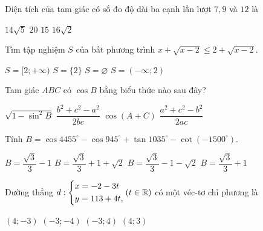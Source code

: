 \begin{ex}%
Diện tích của tam giác có số đo độ dài ba cạnh lần lượt  $7,9$ và $12$ là 

	\choice
{\True $14\sqrt{5}$}
{$20$}
{$15$}
{$16\sqrt{2}$}
\end{ex}

\begin{ex}%
Tìm tập nghiệm $S$ của bất phương trình $x+\sqrt{x-2} \le 2+\sqrt{x-2}$.

	\choice
{$S=[2;+\infty)$}
{\True $S=\{2\}$}
{$S=\varnothing$}
{$S=(-\infty;2)$}
\end{ex}

\begin{ex}%
Tam giác $ABC$ có $\cos B$ bằng biểu thức nào sau đây?

	\choice
{$\sqrt{1-\sin^2B}$}
{$\dfrac{b^2+c^2-a^2}{2bc}$}
{$\cos(A+C)$}
{\True $\dfrac{a^2+c^2-b^2}{2ac}$}
\end{ex}

\begin{ex}%
Tính $B = \cos 4455^\circ - \cos 945^\circ + \tan 1035^\circ - \cot(-1500^\circ).$

	\choice
{\True $B = \dfrac{\sqrt{3}}{3} -1$}
{$B =  \dfrac{\sqrt{3}}{3} +1+\sqrt{2}$}
{$B =  \dfrac{\sqrt{3}}{3} -1-\sqrt{2}$}
{$B =  \dfrac{\sqrt{3}}{3} +1$}
\end{ex}

\begin{ex}%
Đường thẳng $d: \left\{\begin{aligned}& x = -2-3t \\ & y = 113+4t,\end{aligned}\right. (t \in \mathbb{R})$ có một véc-tơ chỉ phương là

	\choice
{$(4;-3)$}
{$(-3;-4)$}
{\True $(-3;4)$}
{$(4;3)$}
\end{ex}

